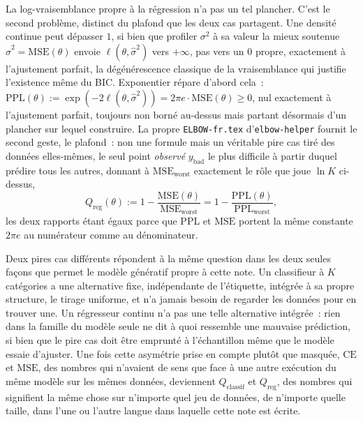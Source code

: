 \documentclass[11pt]{article}
\newcommand{\code}[1]{\texttt{#1}}
\begin{document}
La log-vraisemblance propre à la régression n'a pas un tel plancher.
C'est le second problème, distinct du plafond que les deux cas
partagent. Une densité continue peut dépasser $1$, si bien que profiler
$\sigma^2$ à sa valeur la mieux soutenue $\hat\sigma^2 =
\mathrm{MSE}(\theta)$ envoie $\ell(\theta,\hat\sigma^2)$ vers $+\infty$,
pas vers un $0$ propre, exactement à l'ajustement parfait, la
dégénérescence classique de la vraisemblance qui justifie l'existence
même du BIC. Exponentier répare d'abord cela~: $\mathrm{PPL}(\theta) :=
\exp(-2\ell(\theta,\hat\sigma^2)) = 2\pi e \cdot \mathrm{MSE}(\theta)
\ge 0$, nul exactement à l'ajustement parfait, toujours non borné
au-dessus mais partant désormais d'un plancher sur lequel construire.
La propre \code{ELBOW-fr.tex} d'\code{elbow-helper} fournit le second
geste, le plafond~: non une formule mais un véritable pire cas tiré des
données elles-mêmes, le seul point \emph{observé} $y_{\text{bad}}$ le
plus difficile à partir duquel prédire tous les autres, donnant à
$\mathrm{MSE}_{\text{worst}}$ exactement le rôle que joue $\ln K$
ci-dessus,
$$Q_{\text{reg}}(\theta) := 1 - \frac{\mathrm{MSE}(\theta)}{\mathrm{MSE}_{\text{worst}}} = 1 - \frac{\mathrm{PPL}(\theta)}{\mathrm{PPL}_{\text{worst}}},$$
les deux rapports étant égaux parce que $\mathrm{PPL}$ et
$\mathrm{MSE}$ portent la même constante $2\pi e$ au numérateur comme
au dénominateur.

Deux pires cas différents répondent à la même question dans les deux
seules façons que permet le modèle génératif propre à cette note. Un
classifieur à $K$ catégories a une alternative fixe, indépendante de
l'étiquette, intégrée à sa propre structure, le tirage uniforme, et
n'a jamais besoin de regarder les données pour en trouver une. Un
régresseur continu n'a pas une telle alternative intégrée~: rien dans
la famille du modèle seule ne dit à quoi ressemble une mauvaise
prédiction, si bien que le pire cas doit être emprunté à l'échantillon
même que le modèle essaie d'ajuster. Une fois cette asymétrie prise en
compte plutôt que masquée, $\mathrm{CE}$ et $\mathrm{MSE}$, des nombres
qui n'avaient de sens que face à une autre exécution du même modèle sur
les mêmes données, deviennent $Q_{\text{classif}}$ et $Q_{\text{reg}}$,
des nombres qui signifient la même chose sur n'importe quel jeu de
données, de n'importe quelle taille, dans l'une ou l'autre langue dans
laquelle cette note est écrite.

\clearpage


\end{document}
